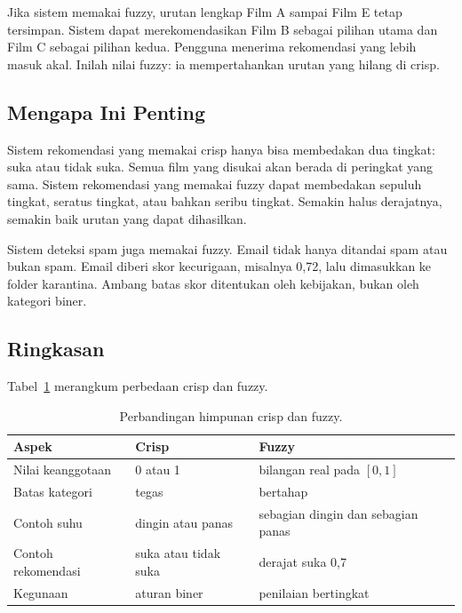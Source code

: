 \documentclass[11pt,a4paper]{article}
\begin{document}
Jika sistem memakai fuzzy, urutan lengkap Film A sampai Film E tetap tersimpan. Sistem dapat merekomendasikan Film B sebagai pilihan utama dan Film C sebagai pilihan kedua. Pengguna menerima rekomendasi yang lebih masuk akal. Inilah nilai fuzzy: ia mempertahankan urutan yang hilang di crisp.

\subsection{Mengapa Ini Penting}

Sistem rekomendasi yang memakai crisp hanya bisa membedakan dua tingkat: suka atau tidak suka. Semua film yang disukai akan berada di peringkat yang sama. Sistem rekomendasi yang memakai fuzzy dapat membedakan sepuluh tingkat, seratus tingkat, atau bahkan seribu tingkat. Semakin halus derajatnya, semakin baik urutan yang dapat dihasilkan.

Sistem deteksi spam juga memakai fuzzy. Email tidak hanya ditandai spam atau bukan spam. Email diberi skor kecurigaan, misalnya 0,72, lalu dimasukkan ke folder karantina. Ambang batas skor ditentukan oleh kebijakan, bukan oleh kategori biner.

\subsection{Ringkasan}

Tabel~\ref{tab:crisp-fuzzy} merangkum perbedaan crisp dan fuzzy.

\begin{table}[H]
	\centering
	\caption{Perbandingan himpunan crisp dan fuzzy.}
	\label{tab:crisp-fuzzy}
	\small
	\begin{tabularx}{\textwidth}{l X X}
		\toprule
		Aspek              & Crisp                & Fuzzy                              \\
		\midrule
		Nilai keanggotaan  & 0 atau 1             & bilangan real pada $[0,1]$         \\
		Batas kategori     & tegas                & bertahap                           \\
		Contoh suhu        & dingin atau panas    & sebagian dingin dan sebagian panas \\
		Contoh rekomendasi & suka atau tidak suka & derajat suka 0,7                   \\
		Kegunaan           & aturan biner         & penilaian bertingkat               \\
		\bottomrule
	\end{tabularx}
\end{table}
\end{document}
